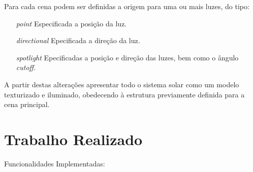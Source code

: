 \documentclass[runningheads]{llncs}
\begin{document}
    Para cada cena podem ser definidas a origem para uma ou mais luzes, 
    do tipo:
    \begin{itemize}
        \item[\textit{point}]{Especificada a posição da luz.}
        \item[\textit{directional}]{Epecificada a direção da luz.}
        \item[\textit{spotlight}]{Epecificadas a posição e direção das luzes,
                                  bem como o ângulo \textit{cutoff}.}
    \end{itemize}

    A partir destas alterações apresentar todo o sistema solar como um modelo texturizado e iluminado, 
    obedecendo à estrutura previamente definida para a cena principal.
    
    \section{Trabalho Realizado}
    
    Funcionalidades Implementadas:
    
\end{document}
